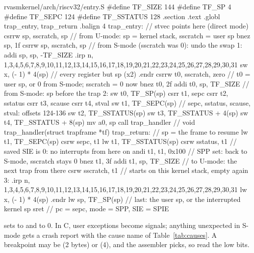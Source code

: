 \documentclass[11pt,a4paper]{article}
\begin{document}
\begin{lst}{rvasm}{kernel/arch/riscv32/entry.S}
#define TF_SIZE 144
#define TF_SP 4
#define TF_SEPC 124
#define TF_SSTATUS 128
    .section .text
    .globl trap_entry, trap_return
    .balign 4
trap_entry:                         // stvec points here (direct mode)
    csrrw sp, sscratch, sp          // from U-mode: sp = kernel stack, sscratch = user sp
    bnez  sp, 1f
    csrrw sp, sscratch, sp          // from S-mode (sscratch was 0): undo the swap
1:  addi  sp, sp, -TF_SIZE
    .irp n, 1,3,4,5,6,7,8,9,10,11,12,13,14,15,16,17,18,19,20,21,22,23,24,25,26,27,28,29,30,31
    sw    x\n, (\n - 1) * 4(sp)     // every register but sp (x2)
    .endr
    csrrw t0, sscratch, zero        // t0 = user sp, or 0 from S-mode; sscratch = 0 now
    bnez  t0, 2f
    addi  t0, sp, TF_SIZE           // from S-mode: sp before the trap
2:  sw    t0, TF_SP(sp)
    csrr  t1, sepc
    csrr  t2, sstatus
    csrr  t3, scause
    csrr  t4, stval
    sw    t1, TF_SEPC(sp)           // sepc, sstatus, scause, stval: offsets 124-136
    sw    t2, TF_SSTATUS(sp)
    sw    t3, TF_SSTATUS + 4(sp)
    sw    t4, TF_SSTATUS + 8(sp)
    mv    a0, sp
    call  trap_handler              // void trap_handler(struct trapframe *tf)
trap_return:                        // sp = the frame to resume
    lw    t1, TF_SEPC(sp)
    csrw  sepc, t1
    lw    t1, TF_SSTATUS(sp)
    csrw  sstatus, t1               // saved SIE is 0: no interrupts from here on
    andi  t1, t1, 0x100             // SPP set: back to S-mode, sscratch stays 0
    bnez  t1, 3f
    addi  t1, sp, TF_SIZE           // to U-mode: the next trap from there
    csrw  sscratch, t1              //   starts on this kernel stack, empty again
3:  .irp n, 1,3,4,5,6,7,8,9,10,11,12,13,14,15,16,17,18,19,20,21,22,23,24,25,26,27,28,29,30,31
    lw    x\n, (\n - 1) * 4(sp)
    .endr
    lw    sp, TF_SP(sp)             // last: the user sp, or the interrupted kernel sp
    sret                            // pc = sepc, mode = SPP, SIE = SPIE
\end{lst}

 sets  to  and  to 0. In C, user exceptions become
signals; anything unexpected in S-mode gets a crash report with the cause name of Table~\ref{tab:causes}. A breakpoint
may be  (2 bytes) or  (4), and the assembler picks, so read the low bits.
\end{document}
